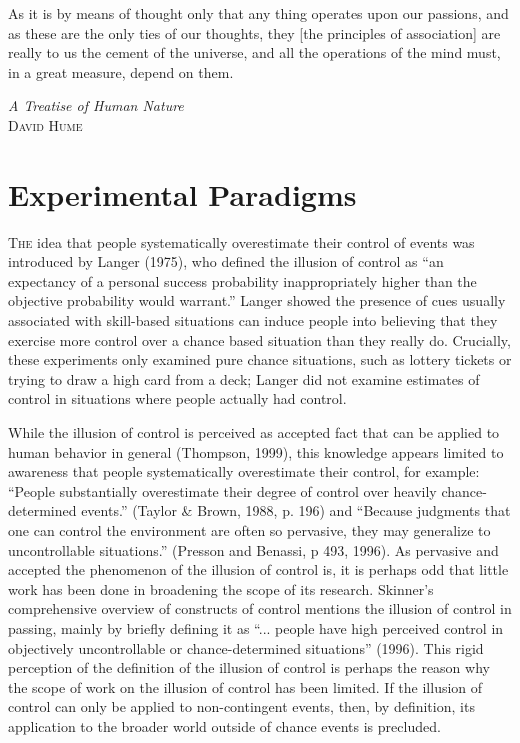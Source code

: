 \documentclass[USenglish,letterpaper,12pt,extrafontsizes,oneside,onecolumn,final]{memoir}
\begin{document}
\epigraph{\SingleSpacing As it is by means of thought only that any thing operates upon our passions, and as these are the only ties of our thoughts, they [the principles of association] are really to us the cement of the universe, and all the operations of the mind must, in a great measure, depend on them.}{\textit{A Treatise of Human Nature}\\ \textsc{David Hume}}

\section{Experimental Paradigms}

\lettrine[lines=2,slope=-3pt,nindent=2pt]{T}{he} idea that people systematically overestimate their control of events was introduced by Langer (1975), who defined the illusion of control as ``an expectancy of a personal success probability inappropriately higher than the objective probability would warrant.''  Langer showed the presence of cues usually associated with skill-based situations can induce people into believing that they exercise more control over a chance based situation than they really do.  Crucially, these experiments only examined pure chance situations, such as lottery tickets or trying to draw a high card from a deck; Langer did not examine estimates of control in situations where people actually had control. 

While the illusion of control is perceived as accepted fact that can be applied to human behavior in general (Thompson, 1999), this knowledge appears limited to awareness that people systematically overestimate their control, for example: ``People substantially overestimate their degree of control over heavily chance-determined events.'' (Taylor \& Brown, 1988, p. 196) and ``Because judgments that one can control the environment are often so pervasive, they may generalize to uncontrollable situations.'' (Presson and Benassi, p 493, 1996).   As pervasive and accepted the phenomenon of the illusion of control is, it is perhaps odd that little work has been done in broadening the scope of its research.  Skinner's comprehensive overview of constructs of control mentions the illusion of control in passing, mainly by briefly defining it as ``... people  have high perceived control in objectively uncontrollable or chance-determined situations'' (1996). This rigid perception of the definition of the illusion of control is perhaps the reason why the scope of work on the illusion of control has been limited. If the illusion of control can only be applied to non-contingent events, then, by definition, its application to the broader world outside of chance events is precluded.
\end{document}
